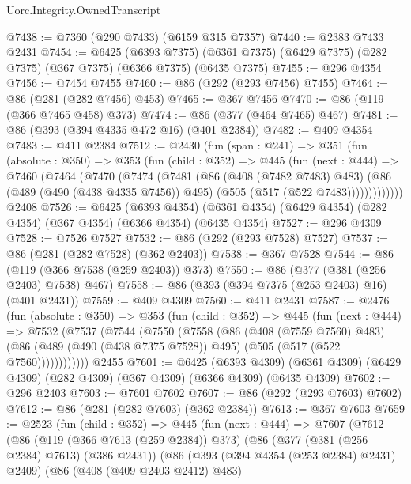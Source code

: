 \begin{lexlean}{Uorc.Integrity.OwnedTranscript}
\begin{coremodule}
@7438 := @7360 (@290 @7433) (@6159 @315 @7357)
@7440 := @2383 @7433 @2431
@7454 := @6425
    (@6393 @7375)
    (@6361 @7375)
    (@6429 @7375)
    (@282 @7375)
    (@367 @7375)
    (@6366 @7375)
    (@6435 @7375)
@7455 := @296 @4354
@7456 := @7454 @7455
@7460 := @86 (@292 (@293 @7456) @7455)
@7464 := @86 (@281 (@282 @7456) @453)
@7465 := @367 @7456
@7470 := @86 (@119 (@366 @7465 @458) @373)
@7474 := @86 (@377 (@464 @7465) @467)
@7481 := @86 (@393 (@394 @4335 @472 @16) (@401 @2384))
@7482 := @409 @4354
@7483 := @411 @2384
@7512 := @2430
    (fun (span : @241) =>
    @351
      (fun (absolute : @350) =>
      @353
        (fun (child : @352) =>
        @445
          (fun (next : @444) =>
          @7460
            (@7464
              (@7470
                (@7474
                  (@7481
                    (@86
                      (@408 (@7482 @7483) @483)
                      (@86
                        (@489 (@490 (@438 @4335 @7456)) @495)
                        (@505 (@517 (@522 @7483)))))))))))))
    @2408
@7526 := @6425
    (@6393 @4354)
    (@6361 @4354)
    (@6429 @4354)
    (@282 @4354)
    (@367 @4354)
    (@6366 @4354)
    (@6435 @4354)
@7527 := @296 @4309
@7528 := @7526 @7527
@7532 := @86 (@292 (@293 @7528) @7527)
@7537 := @86 (@281 (@282 @7528) (@362 @2403))
@7538 := @367 @7528
@7544 := @86 (@119 (@366 @7538 (@259 @2403)) @373)
@7550 := @86 (@377 (@381 (@256 @2403) @7538) @467)
@7558 := @86 (@393 (@394 @7375 (@253 @2403) @16) (@401 @2431))
@7559 := @409 @4309
@7560 := @411 @2431
@7587 := @2476
    (fun (absolute : @350) =>
    @353
      (fun (child : @352) =>
      @445
        (fun (next : @444) =>
        @7532
          (@7537
            (@7544
              (@7550
                (@7558
                  (@86
                    (@408 (@7559 @7560) @483)
                    (@86 (@489 (@490 (@438 @7375 @7528)) @495) (@505 (@517 (@522 @7560))))))))))))
    @2455
@7601 := @6425
    (@6393 @4309)
    (@6361 @4309)
    (@6429 @4309)
    (@282 @4309)
    (@367 @4309)
    (@6366 @4309)
    (@6435 @4309)
@7602 := @296 @2403
@7603 := @7601 @7602
@7607 := @86 (@292 (@293 @7603) @7602)
@7612 := @86 (@281 (@282 @7603) (@362 @2384))
@7613 := @367 @7603
@7659 := @2523
    (fun (child : @352) =>
    @445
      (fun (next : @444) =>
      @7607
        (@7612
          (@86
            (@119 (@366 @7613 (@259 @2384)) @373)
            (@86
              (@377 (@381 (@256 @2384) @7613) (@386 @2431))
              (@86
                (@393 (@394 @4354 (@253 @2384) @2431) @2409)
                (@86
                  (@408 (@409 @2403 @2412) @483)

\end{coremodule}
\end{lexlean}
